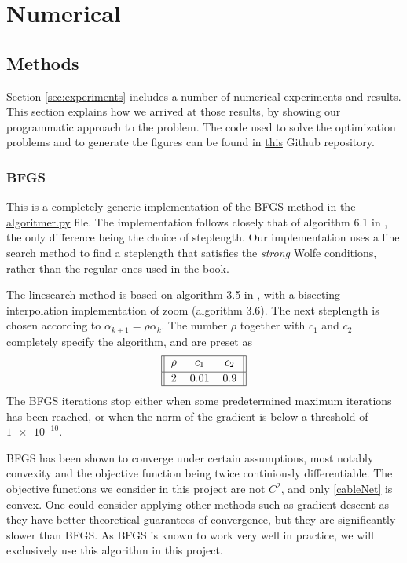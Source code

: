 \section{Numerical}
\subsection{Methods}
Section \ref{sec:experiments} includes a number of numerical experiments and results. This section explains how we arrived at those results, by showing our programmatic approach to the problem. The code used to solve the optimization problems and to generate the figures can be found in \href{https://github.com/otkulseng/Opt1_Project}{this} Github repository.
\subsubsection{BFGS}
This is a completely generic implementation of the BFGS method in the \href{https://github.com/otkulseng/Opt1_Project/blob/main/Kode/algoritmer.py}{algoritmer.py} file. The implementation follows closely that of algorithm 6.1 in \cite{NW}, the only difference being the choice of steplength. Our implementation uses a line search method to find a steplength that satisfies the \emph{strong} Wolfe conditions, rather than the regular ones used in the book.

The linesearch method is based on algorithm 3.5 in \cite{NW}, with a bisecting interpolation implementation of zoom (algorithm 3.6). The next steplength is chosen according to $\alpha_{k+1} = \rho \alpha_k$. The number $\rho$ together with $c_1$ and $c_2$ completely specify the algorithm, and are preset as
\begin{gather}    
\begin{tabular}{||c c c||} 
 \hline
 $\rho$ & $c_1$ & $c_2$ \\ [0.5ex] 
 \hline
2 & 0.01 & 0.9  \\ 
 \hline
\end{tabular}
\end{gather}
The BFGS iterations stop either when some predetermined maximum iterations has been reached, or when the norm of the gradient is below a threshold of $\num{1e-10}$.

BFGS has been shown to converge under certain assumptions, most notably convexity and the objective function being twice continiously differentiable. The objective functions we consider in this project are not $C^2$, and only \eqref{cableNet} is convex. One could consider applying other methods such as gradient descent as they have better theoretical guarantees of convergence, but they are significantly slower than BFGS. As BFGS is known to work very well in practice, we will exclusively use this algorithm in this project.

